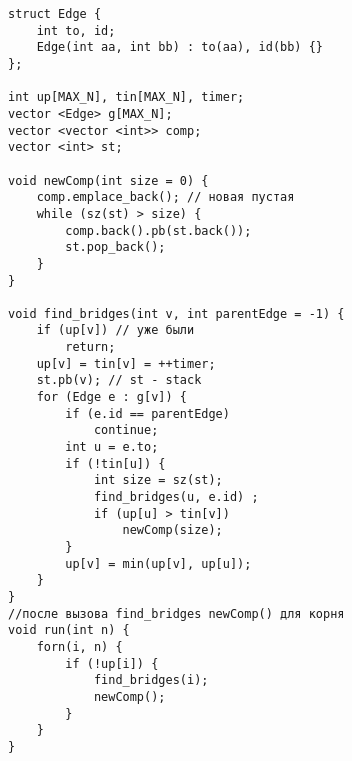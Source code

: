 \begin{verbatim}
struct Edge {
	int to, id;
	Edge(int aa, int bb) : to(aa), id(bb) {}
};

int up[MAX_N], tin[MAX_N], timer;
vector <Edge> g[MAX_N];
vector <vector <int>> comp;
vector <int> st;

void newComp(int size = 0) {
	comp.emplace_back(); // новая пустая
	while (sz(st) > size) {
		comp.back().pb(st.back());
		st.pop_back();
	}
}

void find_bridges(int v, int parentEdge = -1) {
	if (up[v]) // уже были
		return;
	up[v] = tin[v] = ++timer;
	st.pb(v); // st - stack
	for (Edge e : g[v]) {
		if (e.id == parentEdge)
			continue;
		int u = e.to;
		if (!tin[u]) {
			int size = sz(st);
			find_bridges(u, e.id) ;
			if (up[u] > tin[v])
				newComp(size);
		}
		up[v] = min(up[v], up[u]);
	}
}
//после вызова find_bridges newComp() для корня
void run(int n) {
	forn(i, n) {
		if (!up[i]) {
			find_bridges(i);
			newComp();
		}
	}
}
\end{verbatim}
